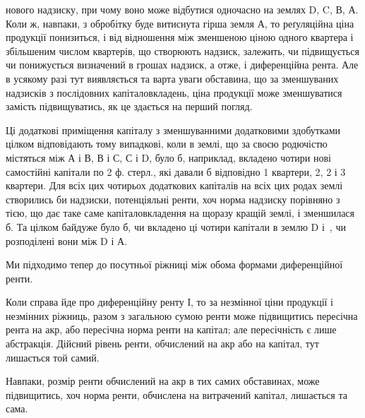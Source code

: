 \parcont{}  %
нового надзиску, при чому воно може відбутися одночасно на землях D, C, В, А.
Коли ж, навпаки, з обробітку буде витиснута гірша земля А, то реґуляційна
ціна продукції понизиться, і від відношення між зменшеною ціною одного
квартера і збільшеним числом квартерів, що створюють надзиск, залежить, чи
підвищується чи понижується визначений в грошах надзиск, а отже, і диференційна
рента. Але в усякому разі тут виявляється та варта уваги обставина,
що за зменшуваних надзисків з послідовних капіталовкладень, ціна продукції
може зменшуватися замість підвищуватись, як це здається на перший погляд.

Ці додаткові приміщення капіталу з зменшуванними додатковими здобутками
цілком відповідають тому випадкові, коли в землі, що за своєю родючістю
містяться між А і В, В і С, С і D, було б, наприклад, вкладено чотири нові
самостійні капітали по 2 ф. стерл., які давали б відповідно 1 квартери,
2, 2 і 3 квартери. Для всіх цих чотирьох додаткових капіталів на всіх
цих родах землі створились би надзиски, потенціяльні ренти, хоч норма надзиску
порівняно з тією, що дає таке саме капіталовкладення на щоразу кращій землі,
і зменшилася б. Та цілком байдуже було б, чи вкладено ці чотири капітали
в землю D і~, чи розподілені вони між D і А.

Ми підходимо тепер до посутньої ріжниці між обома формами диференційної
ренти.

Коли справа йде про диференційну ренту І, то за незмінної ціни продукції
і незмінних ріжниць, разом з загальною сумою ренти може підвищитись
пересічна рента на акр, або пересічна норма ренти на капітал; але пересічність
є лише абстракція. Дійсний рівень ренти, обчислений на акр або на капітал,
тут лишається той самий.

Навпаки, розмір ренти обчислений на акр в тих самих обставинах, може
підвищитись, хоч норма ренти, обчислена на витрачений капітал, лишається
та сама.

